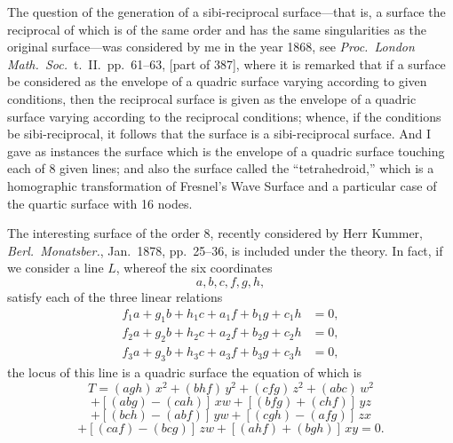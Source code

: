 \documentclass[11pt,a4paper]{article}
\begin{document}
\noindent The question of the generation of a sibi-reciprocal surface---that is, a surface the reciprocal of which is of the same order and has the same singularities as the original surface---was considered by me in the year 1868, see \emph{Proc.\ London Math.\ Soc.}\ t.~II.\ pp.~61--63, [part of 387], where it is remarked that if a surface be considered as the envelope of a quadric surface varying according to given conditions, then the reciprocal surface is given as the envelope of a quadric surface varying according to the reciprocal conditions; whence, if the conditions be sibi-reciprocal, it follows that the surface is a sibi-reciprocal surface. And I gave as instances the surface which is the envelope of a quadric surface touching each of 8 given lines; and also the surface called the ``tetrahedroid,'' which is a homographic transformation of Fresnel's Wave Surface and a particular case of the quartic surface with 16 nodes.

\medskip

The interesting surface of the order 8, recently considered by Herr Kummer, \emph{Berl.\ Monatsber.}, Jan.\ 1878, pp.~25--36, is included under the theory. In fact, if we consider a line $L$, whereof the six coordinates
\[
a, b, c, f, g, h,
\]
satisfy each of the three linear relations
\begin{align*}
f_{1}a + g_{1}b + h_{1}c + a_{1}f + b_{1}g + c_{1}h &= 0,\\
f_{2}a + g_{2}b + h_{2}c + a_{2}f + b_{2}g + c_{2}h &= 0,\\
f_{3}a + g_{3}b + h_{3}c + a_{3}f + b_{3}g + c_{3}h &= 0,
\end{align*}
the locus of this line is a quadric surface the equation of which is
\[
T = (agh)\,x^{2} + (bhf)\,y^{2} + (cfg)\,z^{2} + (abc)\,w^{2}
\]
\[
+ [(abg) - (cah)]\,xw + [(bfg) + (chf)]\,yz
\]
\[
+ [(bch) - (abf)]\,yw + [(cgh) - (afg)]\,zx
\]
\[
+ [(caf) - (bcg)]\,zw + [(ahf) + (bgh)]\,xy = 0.
\]

\newpage

\end{document}
